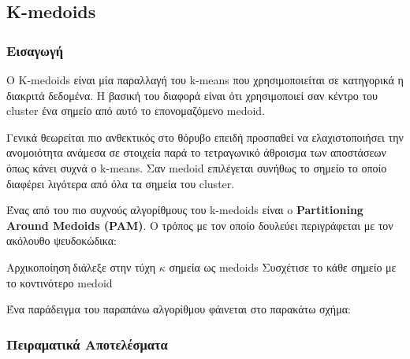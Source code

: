 \subsection{Κ-medoids}

\subsubsection{Εισαγωγή}
Ο K-medoids είναι μία παραλλαγή του k-means που χρησιμοποιείται σε κατηγορικά η διακριτά δεδομένα.
Η βασική του διαφορά είναι ότι χρησιμοποιεί σαν κέντρο του cluster ένα σημείο από αυτό το επονομαζόμενο medoid.

Γενικά θεωρείται πιο ανθεκτικός στο θόρυβο επειδή προσπαθεί να ελαχιστοποιήσει την ανομοιότητα ανάμεσα σε στοιχεία παρά το τετραγωνικό άθροισμα των αποστάσεων όπως κάνει συχνά ο k-means.
Σαν medoid επιλέγεται συνήθως το σημείο το οποίο διαφέρει λιγότερα από όλα τα σημεία του cluster.

Ένας από του πιο συχνούς αλγορίθμους του k-medoids είναι o \textbf{Partitioning Around Medoids (PAM)}.
Ο τρόπος με τον οποίο δουλεύει
περιγράφεται με τον ακόλουθο ψευδοκώδικα:\\
\begin{algorithm}[H]
    Αρχικοποίηση$\:$διάλεξε στην τύχη $\kappa$ σημεία ως medoids\;
    Συσχέτισε το κάθε σημείο με το κοντινότερο medoid\;
\end{algorithm}

Ένα παράδειγμα του παραπάνω αλγορίθμου φάινεται στο παρακάτω σχήμα:\\
\noindent\begin{minipage}{\linewidth}
    \centering
	\label{fig:pam}
\end{minipage}

\subsubsection{Πειραματικά Αποτελέσματα}

